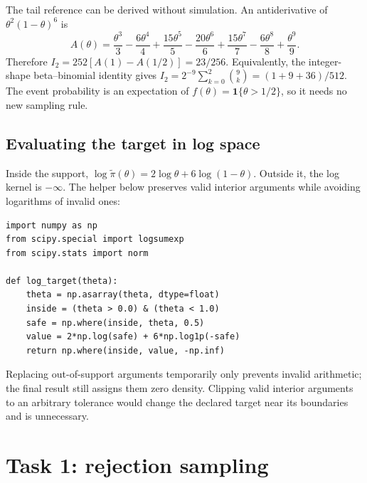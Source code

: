 \documentclass[11pt,a4paper]{article}
\newcommand{\ind}{\mathbf 1}
\begin{document}
The tail reference can be derived without simulation. An antiderivative of
$\theta^2(1-\theta)^6$ is
\[
 A(\theta)=\frac{\theta^3}{3}-\frac{6\theta^4}{4}
 +\frac{15\theta^5}{5}-\frac{20\theta^6}{6}
 +\frac{15\theta^7}{7}-\frac{6\theta^8}{8}+\frac{\theta^9}{9}.
\]
Therefore $I_2=252[A(1)-A(1/2)]=23/256$. Equivalently, the integer-shape
beta--binomial identity gives
$I_2=2^{-9}\sum_{k=0}^{2}\binom9k=(1+9+36)/512$.
The event probability is an expectation of
$f(\theta)=\ind\{\theta>1/2\}$, so it needs no new sampling rule.

\subsection{Evaluating the target in log space}
Inside the support,
$\log\widetilde\pi(\theta)=2\log\theta+6\log(1-\theta)$.
Outside it, the log kernel is $-\infty$. The helper below preserves valid
interior arguments while avoiding logarithms of invalid ones:
\begin{lstlisting}
import numpy as np
from scipy.special import logsumexp
from scipy.stats import norm

def log_target(theta):
    theta = np.asarray(theta, dtype=float)
    inside = (theta > 0.0) & (theta < 1.0)
    safe = np.where(inside, theta, 0.5)
    value = 2*np.log(safe) + 6*np.log1p(-safe)
    return np.where(inside, value, -np.inf)
\end{lstlisting}
Replacing out-of-support arguments temporarily only prevents invalid
arithmetic; the final result still assigns them zero density. Clipping valid
interior arguments to an arbitrary tolerance would change the declared target
near its boundaries and is unnecessary.

\section{Task 1: rejection sampling}
\end{document}
